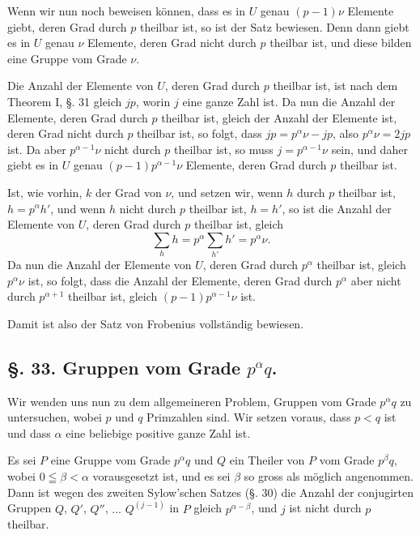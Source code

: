 \documentclass[12pt,a4paper]{article}
\theoremstyle{plain}
\theoremstyle{definition}
\theoremstyle{remark}
\begin{document}
Wenn wir nun noch beweisen können, dass es in $U$ genau $(p-1)\nu$ Elemente giebt, deren Grad durch $p$ theilbar ist, so ist der Satz bewiesen. Denn dann giebt es in $U$ genau $\nu$ Elemente, deren Grad nicht durch $p$ theilbar ist, und diese bilden eine Gruppe vom Grade $\nu$.

Die Anzahl der Elemente von $U$, deren Grad durch $p$ theilbar ist, ist nach dem Theorem I, \S. 31 gleich $jp$, worin $j$ eine ganze Zahl ist. Da nun die Anzahl der Elemente, deren Grad durch $p$ theilbar ist, gleich der Anzahl der Elemente ist, deren Grad nicht durch $p$ theilbar ist, so folgt, dass $jp = p^{\alpha}\nu - jp$, also $p^{\alpha}\nu = 2jp$ ist. Da aber $p^{\alpha-1}\nu$ nicht durch $p$ theilbar ist, so muss $j = p^{\alpha-1}\nu$ sein, und daher giebt es in $U$ genau $(p-1)p^{\alpha-1}\nu$ Elemente, deren Grad durch $p$ theilbar ist.

Ist, wie vorhin, $k$ der Grad von $\nu$, und setzen wir, wenn $h$ durch $p$ theilbar ist, $h = p^{\alpha}h'$, und wenn $h$ nicht durch $p$ theilbar ist, $h = h'$, so ist die Anzahl der Elemente von $U$, deren Grad durch $p$ theilbar ist, gleich
\[
\sum_{h} h = p^{\alpha} \sum_{h'} h' = p^{\alpha}\nu.
\]
Da nun die Anzahl der Elemente von $U$, deren Grad durch $p^{\alpha}$ theilbar ist, gleich $p^{\alpha}\nu$ ist, so folgt, dass die Anzahl der Elemente, deren Grad durch $p^{\alpha}$ aber nicht durch $p^{\alpha+1}$ theilbar ist, gleich $(p-1)p^{\alpha-1}\nu$ ist.

Damit ist also der Satz von Frobenius vollständig bewiesen.


\subsection*{\S. 33. Gruppen vom Grade $p^{\alpha}q$.}

Wir wenden uns nun zu dem allgemeineren Problem, Gruppen vom Grade $p^{\alpha}q$ zu untersuchen, wobei $p$ und $q$ Primzahlen sind. Wir setzen voraus, dass $p < q$ ist und dass $\alpha$ eine beliebige positive ganze Zahl ist.

Es sei $P$ eine Gruppe vom Grade $p^{\alpha}q$ und $Q$ ein Theiler von $P$ vom Grade $p^{\beta}q$, wobei $0 \leqq \beta < \alpha$ vorausgesetzt ist, und es sei $\beta$ so gross als möglich angenommen. Dann ist wegen des zweiten Sylow'schen Satzes (\S. 30) die Anzahl der conjugirten Gruppen $Q$, $Q'$, $Q''$, $\ldots$ $Q^{(j-1)}$ in $P$ gleich $p^{\alpha-\beta}$, und $j$ ist nicht durch $p$ theilbar.
\end{document}
